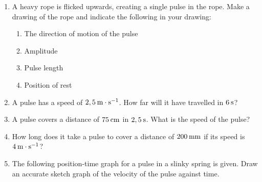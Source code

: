       
      \label{m38802*id316647}\begin{enumerate}[noitemsep, label=\textbf{\arabic*}. ] 
            \label{m38802*uid66}\item A heavy rope is flicked upwards, creating a single pulse in the rope. Make a drawing of the rope and indicate the following in your drawing:
\label{m38802*id316663}\begin{enumerate}[noitemsep, label=\textbf{\alph*}. ] 
            \label{m38802*uid67}\item The direction of motion of the pulse
\label{m38802*uid68}\item Amplitude
\label{m38802*uid69}\item Pulse length
\label{m38802*uid70}\item Position of rest
\end{enumerate}
                \label{m38802*uid71}\item A pulse has a speed of \begin{math}2,5\phantom{\rule{2pt}{0ex}}\mathrm{m}\ensuremath{\cdot}\mathrm{s}{}^{-1}\end{math}. How far will it have travelled in \begin{math}6\phantom{\rule{2pt}{0ex}}\mathrm{s}\end{math}?\newline
            
\label{m38802*uid72}\item A pulse covers a distance of \begin{math}75\phantom{\rule{2pt}{0ex}}\mathrm{cm}\end{math} in \begin{math}2,5\phantom{\rule{2pt}{0ex}}\mathrm{s}\end{math}. What is the speed of the pulse?\newline
            
\label{m38802*uid73}\item How long does it take a pulse to cover a distance of \begin{math}200\phantom{\rule{2pt}{0ex}}\mathrm{mm}\end{math} if its speed is \begin{math}4\phantom{\rule{2pt}{0ex}}\mathrm{m}\ensuremath{\cdot}\mathrm{s}{}^{-1}\end{math}?\newline
            
\label{m38802*uid74}\item The following position-time graph for a pulse in a slinky spring is given. Draw an accurate sketch graph of the velocity of the pulse against time.


\end{enumerate}
